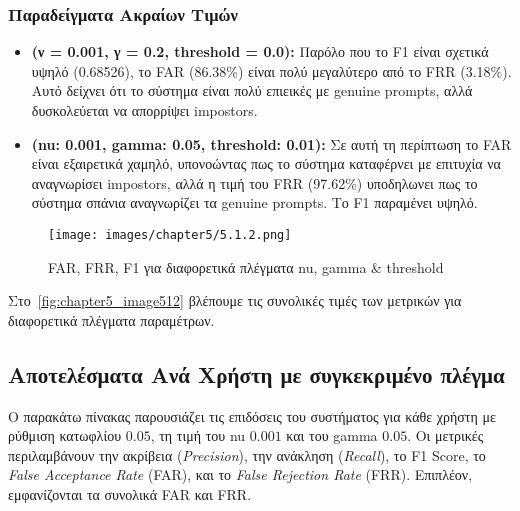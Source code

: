 \subsubsection{Παραδείγματα Ακραίων Τιμών}
\begin{itemize}
    \item \textbf{(ν = 0.001, γ = 0.2, threshold = 0.0):}
    Παρόλο που το F1 είναι σχετικά υψηλό (0.68526), το FAR (86.38\%) είναι πολύ μεγαλύτερο από το FRR (3.18\%). Αυτό δείχνει ότι το σύστημα είναι πολύ επιεικές με genuine prompts, αλλά δυσκολεύεται να απορρίψει impostors.
    \item \textbf{(nu: 0.001, gamma: 0.05, threshold: 0.01):}
    Σε αυτή τη περίπτωση το FAR είναι εξαιρετικά χαμηλό, υπονοώντας πως το σύστημα καταφέρνει με επιτυχία να αναγνωρίσει impostors, αλλά η τιμή του FRR (97.62\%) υποδηλωνει πως το σύστημα σπάνια αναγνωρίζει τα genuine prompts. Το F1 παραμένει υψηλό.
\end{itemize}

\begin{figure}[H]
    \centering
    \texttt{[image: images/chapter5/5.1.2.png]}
    \caption{FAR, FRR, F1 για διαφορετικά πλέγματα nu, gamma \& threshold}
    \label{fig:chapter5_image512}
\end{figure}

Στο~\autoref{fig:chapter5_image512} βλέπουμε τις συνολικές τιμές των μετρικών για διαφορετικά πλέγματα παραμέτρων.

\subsection{Αποτελέσματα Ανά Χρήστη με συγκεκριμένο πλέγμα}
\label{sec:results_threshold_0.05}

Ο παρακάτω πίνακας παρουσιάζει τις επιδόσεις του συστήματος για κάθε χρήστη με ρύθμιση κατωφλίου $0.05$, τη τιμή του nu $0.001$ και του gamma $0.05$. Οι μετρικές περιλαμβάνουν την ακρίβεια (\emph{Precision}), την ανάκληση (\emph{Recall}), το F1 Score, το \emph{False Acceptance Rate} (FAR), και το \emph{False Rejection Rate} (FRR). Επιπλέον, εμφανίζονται τα συνολικά FAR και FRR.

